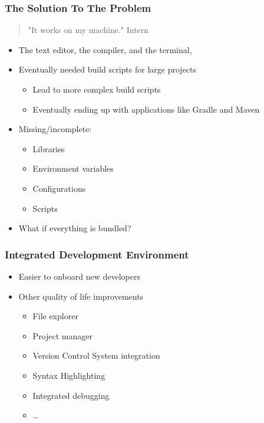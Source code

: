 \begin{frame}
  \frametitle{The Solution To The Problem}
  \begin{quote}
    "It works on my machine." \textemdash Intern
  \end{quote}
  \begin{itemize}
    \item The text editor, the compiler, and the terminal,
    \pause
    \item Eventually needed build scripts for large projects
    \pause
    \begin{itemize}
      \item Lead to more complex build scripts
      \pause
      \item Eventually ending up with applications like Gradle and Maven
      \pause
    \end{itemize}
    \item Missing/incomplete:
    \pause
    \begin{itemize}
      \item Libraries
      \pause
      \item Environment variables
      \pause
      \item Configurations
      \pause
      \item Scripts
      \pause
    \end{itemize}
  \item What if everything is bundled?
  \end{itemize}
\end{frame}

\begin{frame}
  \frametitle{Integrated Development Environment}
  \begin{itemize}
    \item Easier to onboard new developers
    \pause
    \item Other quality of life improvements
    \pause
    \begin{itemize}
      \item File explorer
      \pause
      \item Project manager
      \pause
      \item Version Control System integration
      \pause
      \item Syntax Highlighting
      \pause
      \item Integrated debugging
      \pause
      \item \dots
    \end{itemize}
  \end{itemize}
\end{frame}

